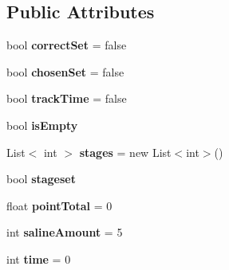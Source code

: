 \subsection*{Public Attributes}
\begin{DoxyCompactItemize}
\item 
bool {\bfseries correct\+Set} = false\hypertarget{class_object_message_handler_a69b08ff8db6189123f39eb9e1305517c}{}\label{class_object_message_handler_a69b08ff8db6189123f39eb9e1305517c}

\item 
bool {\bfseries chosen\+Set} = false\hypertarget{class_object_message_handler_a318b751e1c2662ccc27c12807711aeb4}{}\label{class_object_message_handler_a318b751e1c2662ccc27c12807711aeb4}

\item 
bool {\bfseries track\+Time} = false\hypertarget{class_object_message_handler_a41174d2a195a8d2b395347d1637f0004}{}\label{class_object_message_handler_a41174d2a195a8d2b395347d1637f0004}

\item 
bool {\bfseries is\+Empty}\hypertarget{class_object_message_handler_a74e7b0bec969242211819719c30ff724}{}\label{class_object_message_handler_a74e7b0bec969242211819719c30ff724}

\item 
List$<$ int $>$ {\bfseries stages} = new List$<$int$>$()\hypertarget{class_object_message_handler_aef719aa17f62ec5889d25e20896dc43e}{}\label{class_object_message_handler_aef719aa17f62ec5889d25e20896dc43e}

\item 
bool {\bfseries stageset}\hypertarget{class_object_message_handler_a5aeb3e25e24ed7dad2ad0f9d8baa2e6e}{}\label{class_object_message_handler_a5aeb3e25e24ed7dad2ad0f9d8baa2e6e}

\item 
float {\bfseries point\+Total} = 0\hypertarget{class_object_message_handler_ac8979727fc7c31492aee1406fc2928dc}{}\label{class_object_message_handler_ac8979727fc7c31492aee1406fc2928dc}

\item 
int {\bfseries saline\+Amount} = 5\hypertarget{class_object_message_handler_a278ab01e7a933cfa92bfeb567ecfbe2e}{}\label{class_object_message_handler_a278ab01e7a933cfa92bfeb567ecfbe2e}

\item 
int {\bfseries time} = 0\hypertarget{class_object_message_handler_a2d7e0014f28cc04fedb7a25a543f312b}{}\label{class_object_message_handler_a2d7e0014f28cc04fedb7a25a543f312b}


\end{DoxyCompactItemize}
